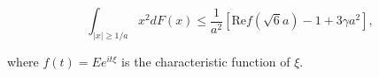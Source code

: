$$\int_{|x| \geq 1/a} x^2 dF(x) \leq \frac{1}{a^2} \left[ \text{Re} f(\sqrt{6}a) - 1 + 3\gamma a^2 \right],$$

where $f(t) = E e^{it\xi}$ is the characteristic function of $\xi$.
